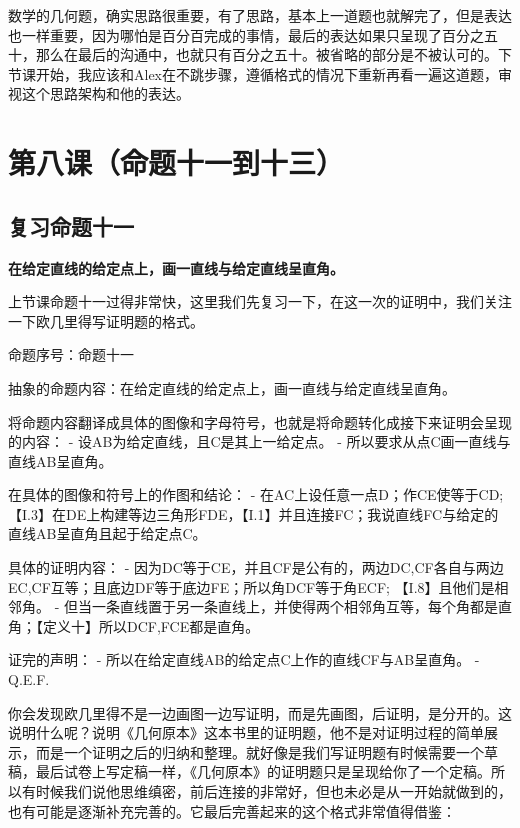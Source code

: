 \documentclass[
]{book}
\begin{document}
数学的几何题，确实思路很重要，有了思路，基本上一道题也就解完了，但是表达也一样重要，因为哪怕是百分百完成的事情，最后的表达如果只呈现了百分之五十，那么在最后的沟通中，也就只有百分之五十。被省略的部分是不被认可的。下节课开始，我应该和Alex在不跳步骤，遵循格式的情况下重新再看一遍这道题，审视这个思路架构和他的表达。

\hypertarget{ux7b2cux516bux8bfeux547dux9898ux5341ux4e00ux5230ux5341ux4e09}{%
\chapter{第八课（命题十一到十三）}\label{ux7b2cux516bux8bfeux547dux9898ux5341ux4e00ux5230ux5341ux4e09}}

\hypertarget{ux590dux4e60ux547dux9898ux5341ux4e00}{%
\section{复习命题十一}\label{ux590dux4e60ux547dux9898ux5341ux4e00}}

\textbf{在给定直线的给定点上，画一直线与给定直线呈直角。}

上节课命题十一过得非常快，这里我们先复习一下，在这一次的证明中，我们关注一下欧几里得写证明题的格式。

命题序号：命题十一

抽象的命题内容：在给定直线的给定点上，画一直线与给定直线呈直角。

将命题内容翻译成具体的图像和字母符号，也就是将命题转化成接下来证明会呈现的内容：
- 设AB为给定直线，且C是其上一给定点。
- 所以要求从点C画一直线与直线AB呈直角。

在具体的图像和符号上的作图和结论：
- 在AC上设任意一点D；作CE使等于CD;【I.3】在DE上构建等边三角形FDE，【I.1】并且连接FC；我说直线FC与给定的直线AB呈直角且起于给定点C。

具体的证明内容：
- 因为DC等于CE，并且CF是公有的，两边DC,CF各自与两边EC,CF互等；且底边DF等于底边FE；所以角DCF等于角ECF; 【I.8】且他们是相邻角。
- 但当一条直线置于另一条直线上，并使得两个相邻角互等，每个角都是直角；【定义十】所以DCF,FCE都是直角。

证完的声明：
- 所以在给定直线AB的给定点C上作的直线CF与AB呈直角。
- Q.E.F.

你会发现欧几里得不是一边画图一边写证明，而是先画图，后证明，是分开的。这说明什么呢？说明《几何原本》这本书里的证明题，他不是对证明过程的简单展示，而是一个证明之后的归纳和整理。就好像是我们写证明题有时候需要一个草稿，最后试卷上写定稿一样，《几何原本》的证明题只是呈现给你了一个定稿。所以有时候我们说他思维缜密，前后连接的非常好，但也未必是从一开始就做到的，也有可能是逐渐补充完善的。它最后完善起来的这个格式非常值得借鉴：
\end{document}
